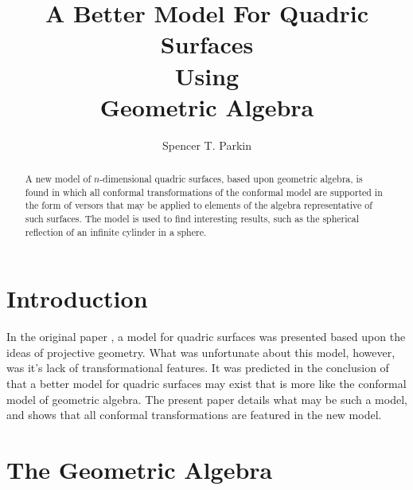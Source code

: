 \documentclass{birkjour}
\theoremstyle{definition}
\theoremstyle{remark}
\numberwithin{equation}{section}
\begin{document}
\title{A Better Model For Quadric Surfaces\\Using\\Geometric Algebra}

\author{Spencer T. Parkin}
\address{%
2113 S. Claremont Dr.\\
Bountiful, Utah  84010\\
USA}





\begin{abstract}
A new model of $n$-dimensional quadric surfaces, based upon geometric algebra, is
found in which all conformal transformations of the conformal model are supported in the form of versors that
may be applied to elements of the algebra representative of such surfaces.  The model is used
to find interesting results, such as the spherical reflection of an infinite cylinder in a sphere.
\end{abstract}

\maketitle

\section{Introduction}

In the original paper \cite{Parkin12}, a model for quadric surfaces was
presented based upon the ideas of projective geometry.  What was unfortunate
about this model, however, was it's lack of transformational features.  It was
predicted in the conclusion of \cite{Parkin12} that a better model for quadric
surfaces may exist that is more like the conformal model of geometric algebra.
The present paper details what may be such a model, and shows that all conformal
transformations are featured in the new model.

\section{The Geometric Algebra}
\end{document}
